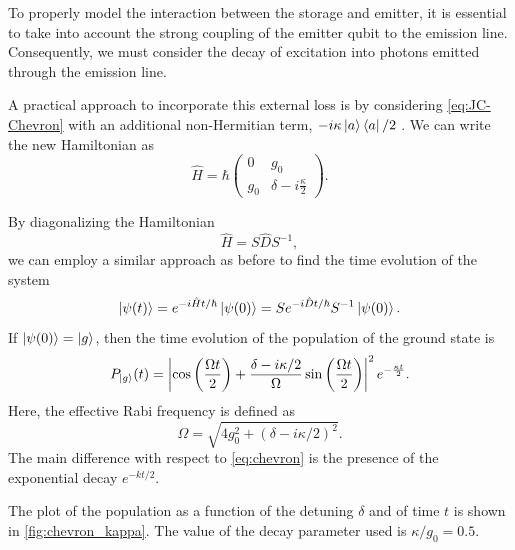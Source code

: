 To properly model the interaction between the storage and emitter, it is essential to take into account the strong coupling of the emitter qubit to the emission line. 
Consequently, we must consider the decay of excitation into photons emitted through the emission line. 

A practical approach to incorporate this external loss is by considering \cref{eq:JC-Chevron} with an additional non-Hermitian term, $-i \kappa \ket{a} \bra{a} / 2$ \cite{Magnard2021}.
We can write the new Hamiltonian as
\begin{equation}
\label{eq:JC-decay}
    \hat{H} = \hbar
    \begin{pmatrix}
        0       & g_0       \\
        g_0   & \delta - i \frac{\kappa}{2} 
    \end{pmatrix}  .
\end{equation}

By diagonalizing the Hamiltonian
\begin{equation}
    \hat{H} = S \hat{D} S^{-1} ,
\end{equation}
we can employ a similar approach as before to find the time evolution of the system
\begin{equation}
    \ket{\psi (t)} = e^{-i \hat{H} t / \hbar} \ket{\psi(0)}= 
    S e^{-i \hat{D} t / \hbar} S^{-1} \ket{\psi(0)} .
\end{equation}
If $\ket{\psi(0)} = \ket{g}$, then the time evolution of the population of the ground state is
\begin{equation}
\label{eq:chevron_kappa}
    P_{\ket{g}} (t) = 
\left| \cos \left(\frac{\Omega t}{2} \right) + \frac{\delta - i \kappa / 2}{\Omega} \sin \left(\frac{\Omega t}{2} \right) \right|^2 e^{- \frac{\kappa t}{2}} .
\end{equation}
Here, the effective Rabi frequency is defined as
\begin{equation}
\label{eq:eff_Raby_kappa}
    \Omega = \sqrt{4 g_0^2 + \left( \delta - i \kappa / 2 \right)^2} .
\end{equation}
The main difference with respect to \cref{eq:chevron} is the presence of the exponential decay $e^{-kt/2}$.

The plot of the population as a function of the detuning $\delta$ and of time $t$ is shown in \cref{fig:chevron_kappa}.
The value of the decay parameter used is $\kappa / g_0 = 0.5$.
